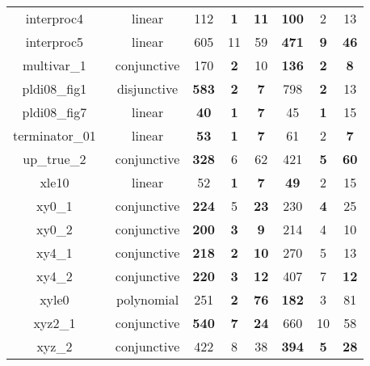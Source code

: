 \begin{table}[t]
\begin{tabular}{l c | c c c | c c c |}
\multicolumn{1}{|c|}{interproc4~\cite{jeannet2010interproc}}	&linear 		&112	&\textbf{1}	&\textbf{11}	&\textbf{100}	&2	&13\\
\multicolumn{1}{|c|}{interproc5~\cite{jeannet2010interproc}}	&linear			&605	&11	&59 &\textbf{471}	&\textbf{9}	&\textbf{46}\\
\multicolumn{1}{|c|}{multivar\_1~\cite{jeannet2010interproc}}	&conjunctive	&170	&\textbf{2}	&10	&\textbf{136}	&\textbf{2}	&\textbf{8}\\
\multicolumn{1}{|c|}{pldi08\_fig1~\cite{gulavani2008automatically}}&disjunctive	&\textbf{583} & \textbf{2} & \textbf{7}   &798 & \textbf{2} & 13						\\
\multicolumn{1}{|c|}{pldi08\_fig7~\cite{gulavani2008automatically}}	&linear		&\textbf{40}	&\textbf{1}	&\textbf{7}	   &45	&\textbf{1}	&15							\\
\multicolumn{1}{|c|}{terminator\_01~\cite{Dirk:SVCOMP:2016}}	&linear 			&\textbf{53}	&\textbf{1}	&\textbf{7}	&61	&2	&\textbf{7}\\
\multicolumn{1}{|c|}{up\_true\_2~\cite{isil2013inductive}}		&conjunctive	&\textbf{328}	&6	&62					   &421	&\textbf{5}	&\textbf{60}				\\
\multicolumn{1}{|c|}{xle10~\cite{sharma2012interpolants}}		&linear 		&52	&\textbf{1}	&\textbf{7}				   &\textbf{49}	&2	&15							\\
\multicolumn{1}{|c|}{xy0\_1~\cite{sharma2012interpolants}}		&conjunctive	&\textbf{224}	&5	&\textbf{23}		   &230	&\textbf{4}	&25							\\
\multicolumn{1}{|c|}{xy0\_2~\cite{sharma2012interpolants}}		&conjunctive	&\textbf{200}	&\textbf{3}	&\textbf{9}	&214	&4	&10\\
\multicolumn{1}{|c|}{xy4\_1~\cite{sharma2012interpolants}}		&conjunctive	&\textbf{218}	&\textbf{2}	&\textbf{10}	&270	&5	&13\\
\multicolumn{1}{|c|}{xy4\_2~\cite{sharma2012interpolants}}		&conjunctive	&\textbf{220}	&\textbf{3}	&\textbf{12}	&407	&7	&\textbf{12}\\
\multicolumn{1}{|c|}{xyle0~\cite{sharma2012interpolants}}		&polynomial 	&251	&\textbf{2}	&\textbf{76}		   &\textbf{182}	&3	&81						\\
\multicolumn{1}{|c|}{xyz2\_1~\cite{sharma2012interpolants}}		&conjunctive	&\textbf{540}	&\textbf{7}	&\textbf{24}	&660	&10	&58\\
\multicolumn{1}{|c|}{xyz\_2~\cite{sharma2012interpolants}}		&conjunctive	&422	&8	&38							   &\textbf{394}	&\textbf{5}	&\textbf{28}	\\

\end{tabular}
\end{table}
